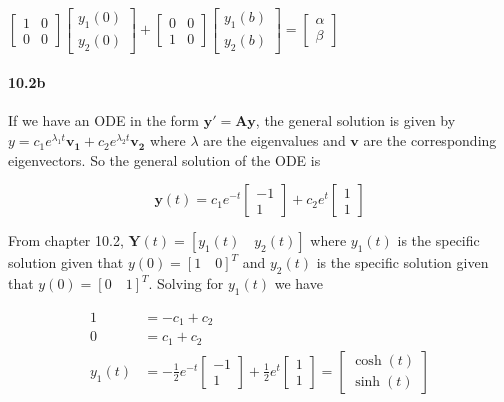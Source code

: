 \documentclass[a4paper, 11pt]{article}
\begin{document}
	$\left[\begin{array}{cc}
	1 & 0\\
	0 & 0
	\end{array}\right]\left[\begin{array}{c}
	y_{1}(0)\\
	y_{2}(0)
	\end{array}\right]+\left[\begin{array}{cc}
	0 & 0\\
	1 & 0
	\end{array}\right]\left[\begin{array}{c}
	y_{1}(b)\\
	y_{2}(b)
	\end{array}\right]=\left[\begin{array}{c}
	\alpha\\
	\beta
	\end{array}\right]$
	
	
	\paragraph{10.2b}
	If we have an ODE in the form $\mathbf{y' = Ay}$, the general solution is given by $y = c_1e^{\lambda_1 t}\mathbf{v_1} + c_2e^{\lambda_2 t}\mathbf{v_2}$ where $\lambda$ are the eigenvalues and $\mathbf{v}$ are the corresponding eigenvectors. So the general solution of the ODE is
	
	$$\mathbf{y}(t) = c_1e^{-t} \left[\begin{array}{c}
	-1\\
	1
	\end{array}\right] + c_2e^{t} \left[\begin{array}{c}
	1\\
	1
	\end{array}\right]$$
	
	From chapter 10.2, $\mathbf{Y}(t) = \left[y_1(t)\quad y_2(t)\right]$ where $y_1(t)$ is the specific solution given that $y(0) = [1\quad 0]^T$ and $y_2(t)$ is the specific solution given that $y(0) = [0\quad 1]^T$. Solving for $y_1(t)$ we have
	
	\begin{align*}
	1 &= -c_1+c_2\\
	0 &= c_1+c_2\\
	y_1(t) &= -\frac{1}{2}e^{-t} \left[\begin{array}{c}
	-1\\
	1
	\end{array}\right] + \frac{1}{2}e^{t} \left[\begin{array}{c}
	1\\
	1
	\end{array}\right] = \left[\begin{array}{c}
	\cosh(t)\\
	\sinh(t)
	\end{array}\right]
	\end{align*}
	
\end{document}

